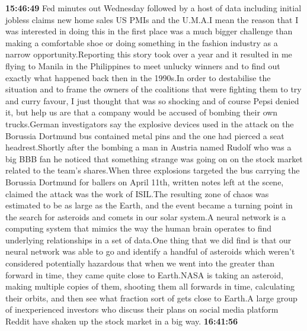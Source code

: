\documentclass{article}%
\begin{document}
\textbf{15:46:49}%
\newline%
Fed minutes out Wednesday followed by a host of data including initial jobless claims new home sales US PMIs and the U.M.A.I mean the reason that I was interested in doing this in the first place was a much bigger challenge than making a comfortable shoe or doing something in the fashion industry as a narrow opportunity.Reporting this story took over a year and it resulted in me flying to Manila in the Philippines to meet unlucky winners and to find out exactly what happened back then in the 1990s.In order to destabilise the situation and to frame the owners of the coalitions that were fighting them to try and curry favour, I just thought that was so shocking and of course Pepsi denied it, but help us are that a company would be accused of bombing their own trucks.German investigators say the explosive devices used in the attack on the Borussia Dortmund bus contained metal pins and the one had pierced a seat headrest.Shortly after the bombing a man in Austria named Rudolf who was a big BBB fan he noticed that something strange was going on on the stock market related to the team's shares.When three explosions targeted the bus carrying the Borussia Dortmund for ballers on April 11th, written notes left at the scene, claimed the attack was the work of ISIL.The resulting zone of chaos was estimated to be as large as the Earth, and the event became a turning point in the search for asteroids and comets in our solar system.A neural network is a computing system that mimics the way the human brain operates to find underlying relationships in a set of data.One thing that we did find is that our neural network was able to go and identify a handful of asteroids which weren't considered potentially hazardous that when we went into the greater than forward in time, they came quite close to Earth.NASA is taking an asteroid, making multiple copies of them, shooting them all forwards in time, calculating their orbits, and then see what fraction sort of gets close to Earth.A large group of inexperienced investors who discuss their plans on social media platform Reddit have shaken up the stock market in a big way.%
\textbf{16:41:56}%
\newline%
\end{document}
